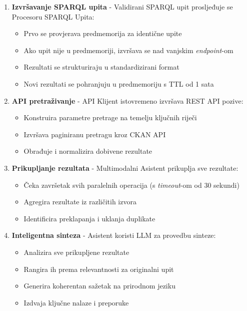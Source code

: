 \begin{enumerate}
    \item \textbf{Izvršavanje SPARQL upita} - Validirani SPARQL upit prosljeđuje se Procesoru SPARQL Upita:
    \begin{itemize}
        \item Prvo se provjerava predmemorija za identične upite
        \item Ako upit nije u predmemoriji, izvršava se nad vanjskim \textit{endpoint}-om
        \item Rezultati se strukturiraju u standardizirani format
        \item Novi rezultati se pohranjuju u predmemoriju s TTL od 1 sata
    \end{itemize}
    
    \item \textbf{API pretraživanje} - API Klijent istovremeno izvršava REST API pozive:
    \begin{itemize}
        \item Konstruira parametre pretrage na temelju ključnih riječi
        \item Izvršava paginiranu pretragu kroz CKAN API
        \item Obrađuje i normalizira dobivene rezultate
    \end{itemize}
    
    \item \textbf{Prikupljanje rezultata} - Multimodalni Asistent prikuplja sve rezultate:
    \begin{itemize}
        \item Čeka završetak svih paralelnih operacija (s \textit{timeout}-om od 30 sekundi)
        \item Agregira rezultate iz različitih izvora
        \item Identificira preklapanja i uklanja duplikate
    \end{itemize}
    
    \item \textbf{Inteligentna sinteza} - Asistent koristi LLM za provedbu sinteze:
    \begin{itemize}
        \item Analizira sve prikupljene rezultate
        \item Rangira ih prema relevantnosti za originalni upit
        \item Generira koherentan sažetak na prirodnom jeziku
        \item Izdvaja ključne nalaze i preporuke
    \end{itemize}
    

\end{enumerate}
